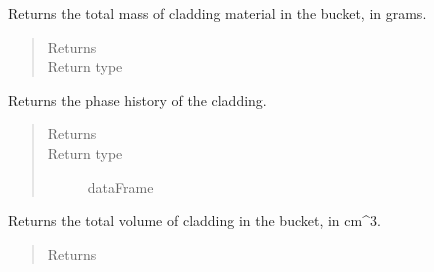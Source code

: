 \documentclass[letterpaper,10pt,openany,oneside,english]{sphinxmanual}
\begin{document}
\begin{fulllineitems}
\begin{fulllineitems}
\end{fulllineitems}


\begin{fulllineitems}
\label{\detokenize{support_rst/fuel_bucket:fuel_bucket.FuelBucket.get_cladding_mass}}
Returns the total mass of cladding material in the bucket, in grams.
\begin{quote}\begin{description}
\item[{Returns}] \leavevmode
{}

\item[{Return type}] \leavevmode
{}

\end{description}\end{quote}

\end{fulllineitems}


\begin{fulllineitems}
\label{\detokenize{support_rst/fuel_bucket:fuel_bucket.FuelBucket.get_cladding_phase}}
Returns the phase history of the cladding.
\begin{quote}\begin{description}
\item[{Returns}] \leavevmode
{}

\item[{Return type}] \leavevmode
dataFrame

\end{description}\end{quote}

\end{fulllineitems}


\begin{fulllineitems}
\label{\detokenize{support_rst/fuel_bucket:fuel_bucket.FuelBucket.get_cladding_volume}}
Returns the total volume of cladding in the bucket, in cm\textasciicircum{}3.
\begin{quote}\begin{description}
\item[{Returns}] \leavevmode
{}


\end{description}
\end{quote}
\end{fulllineitems}
\end{fulllineitems}
\end{document}
